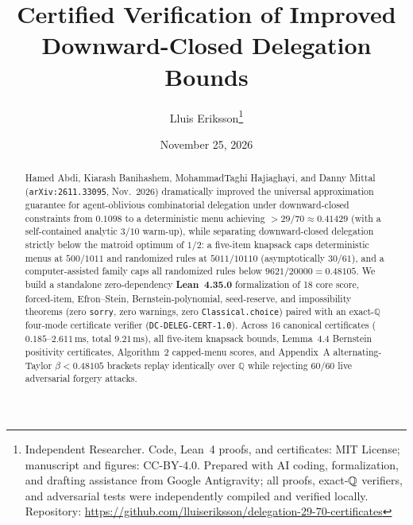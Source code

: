 \documentclass[10pt,twocolumn]{article}
\title{\vspace{-1.1em}\textbf{Certified Verification of Improved Downward-Closed Delegation Bounds}}
\author{Lluis Eriksson\thanks{Independent Researcher. Code, Lean~4 proofs, and certificates: MIT License; manuscript and figures: CC-BY-4.0. Prepared with AI coding, formalization, and drafting assistance from Google Antigravity; all proofs, exact-$\QQ$ verifiers, and adversarial tests were independently compiled and verified locally. Repository: \url{https://github.com/lluiseriksson/delegation-29-70-certificates}}}
\date{November 25, 2026}
\newcommand{\QQ}{\mathbb{Q}}
\begin{document}
\maketitle
\vspace{-1.4em}

\begin{abstract}
Hamed Abdi, Kiarash Banihashem, MohammadTaghi Hajiaghayi, and Danny Mittal (\texttt{arXiv:2611.33095}, Nov.\ 2026) dramatically improved the universal approximation guarantee for agent-oblivious combinatorial delegation under downward-closed constraints from $0.1098$ to a deterministic menu achieving $> 29/70 \approx 0.41429$ (with a self-contained analytic $3/10$ warm-up), while separating downward-closed delegation strictly below the matroid optimum of $1/2$: a five-item knapsack caps deterministic menus at $500/1011$ and randomized rules at $5011/10110$ (asymptotically $30/61$), and a computer-assisted family caps all randomized rules below $9621/20000 = 0.48105$. We build a standalone zero-dependency \textbf{Lean~4.35.0} formalization of 18 core score, forced-item, Efron--Stein, Bernstein-polynomial, seed-reserve, and impossibility theorems (zero \texttt{sorry}, zero warnings, zero \texttt{Classical.choice}) paired with an exact-$\QQ$ four-mode certificate verifier (\texttt{DC-DELEG-CERT-1.0}). Across 16 canonical certificates ($0.185$--$2.611\,\mathrm{ms}$, total $9.21\,\mathrm{ms}$), all five-item knapsack bounds, Lemma~4.4 Bernstein positivity certificates, Algorithm~2 capped-menu scores, and Appendix~A alternating-Taylor $\beta < 0.48105$ brackets replay identically over $\QQ$ while rejecting 60/60 live adversarial forgery attacks.
\end{abstract}
\end{document}
